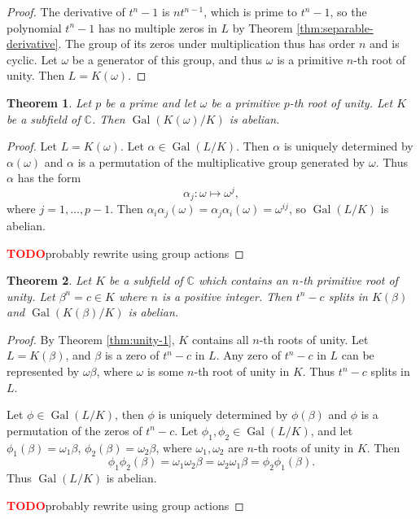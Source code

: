 \documentclass[12pt]{article}
\newtheorem{theorem}{Theorem}
\theoremstyle{definition}
\newcommand{\Gal}{\operatorname{Gal}}
\newcommand{\TODO}{\textbf{\textcolor{red}{TODO}}}
\begin{document}
\begin{proof}
	The derivative of $t^n-1$ is $n t^{n-1}$, which is prime to $t^n-1$, so the polynomial $t^n-1$ has no multiple zeros in $L$ by Theorem \ref{thm:separable-derivative}. The group of its zeros under multiplication thus has order $n$ and is cyclic. Let $\omega$ be a generator of this group, and thus $\omega$ is a primitive $n$-th root of unity. Then $L=K(\omega)$. 
\end{proof}




\begin{theorem} \label{thm:radical-1}
	Let $p$ be a prime and let $\omega$ be a primitive $p$-th root of unity. Let $K$ be a subfield of $\mathbb C$. Then $\Gal(K(\omega) / K)$ is abelian.
\end{theorem}
\begin{proof}
	Let $L = K(\omega)$.  Let $\alpha \in \Gal(L / K)$. Then $\alpha$ is uniquely determined by $\alpha(\omega)$ and $\alpha$ is a permutation of the multiplicative group generated by $\omega$. Thus $\alpha$ has the form
	$$
	\alpha_j: \omega \mapsto \omega^j,
	$$
	where $j=1,\dots,p-1$. Then $\alpha_i \alpha_j (\omega) = \alpha_j \alpha_i (\omega) = \omega^{i j}$, so $ \Gal(L / K)$ is abelian.
	
	\TODO probably rewrite using group actions
\end{proof}

\begin{theorem} \label{thm:radical-2}
	Let $K$ be a subfield of $\mathbb{C}$ which contains an $n$-th primitive root of unity. Let $\beta^n = c \in K $ where $n$ is a positive integer. Then $t^n - c$ splits in $K(\beta)$ and $\Gal(K(\beta) / K)$ is abelian.
\end{theorem}

\begin{proof}
	By Theorem \ref{thm:unity-1}, $K$ contains all $n$-th roots of unity. Let $L = K(\beta)$, and $\beta$ is a zero of $t^n-c$ in $L$. Any zero of $t^n-c$ in $L$ can be represented by $\omega \beta$, where $\omega$ is some $n$-th root of unity in $K$. Thus $t^n - c$ splits in $L$.  
	
	Let $\phi \in \Gal(L / K)$, then $\phi$ is uniquely determined by $\phi(\beta)$ and $\phi$ is a permutation of the zeros of $t^n - c$. Let $\phi_1, \phi_2 \in \Gal(L / K)$, and let $\phi_1(\beta) = \omega_1\beta$, $\phi_2(\beta) = \omega_2\beta$, where $\omega_1, \omega_2$ are $n$-th roots of unity in $K$. Then
	$$
	\phi_1 \phi_2(\beta)=\omega_1 \omega_2 \beta=\omega_2 \omega_1  \beta=\phi_2 \phi_1(\beta).
	$$
	Thus $\Gal(L / K)$ is abelian.
	
	\TODO probably rewrite using group actions
\end{proof}
\end{document}
